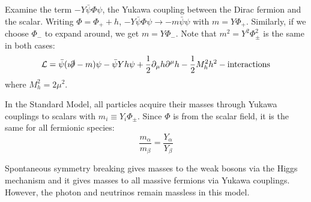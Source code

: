 \documentclass[a4paper,twoside,master.tex]{subfiles}
\begin{document}
Examine the term $ -Y \bar{\psi} \Phi \psi $, the Yukawa coupling between the Dirac fermion and the scalar. Writing $ \Phi = \Phi_+ + h $, $ -Y \bar{\psi} \Phi \psi \to -m \bar{\psi} \psi $ with $ m = Y \Phi_+ $. Similarly, if we choose $ \Phi_- $ to expand around, we get $ m = Y \Phi_- $. Note that $ m^2 = Y^2 \Phi_{\pm}^2 $ is the same in both cases:
\begin{equation}
    \mathcal{L} = \bar{\psi} (\imath \slashed{\partial} - m) \psi - \bar{\psi} Y h \psi + \frac{1}{2} \partial_{\mu} h \partial^{\mu} h - \frac{1}{2} M^2_h h^2 - \text{interactions}
\end{equation}
where $ M^2_h = 2 \mu^2 $.

In the Standard Model, all particles acquire their masses through Yukawa couplings to scalars with $ m_i \equiv Y_i \Phi_{\pm} $. Since $ \Phi $ is from the scalar field, it is the same for all fermionic species:
\begin{equation}
    \frac{m_{\alpha}}{m_{\beta}} = \frac{Y_{\alpha}}{Y_{\beta}}
\end{equation}

Spontaneous symmetry breaking gives masses to the weak bosons via the Higgs mechanism and it gives masses to all massive fermions via Yukawa couplings. However, the photon and neutrinos remain massless in this model.
\end{document}
